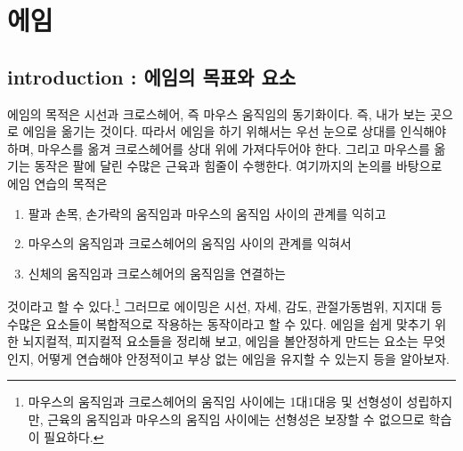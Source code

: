 \chapter{에임}{\label{chap:aim}}
\section{introduction : 에임의 목표와 요소}
에임의 목적은 시선과 크로스헤어, 즉 마우스 움직임의 동기화이다. 즉, 내가 보는 곳으로 에임을 옮기는 것이다. 따라서 에임을 하기 위해서는 우선 눈으로 상대를 인식해야 하며, 마우스를 옮겨 크로스헤어를 상대 위에 가져다두어야 한다. 그리고 마우스를 옮기는 동작은 팔에 달린 수많은 근육과 힘줄이 수행한다. 여기까지의 논의를 바탕으로 에임 연습의 목적은
\begin{enumerate}
    \item 팔과 손목, 손가락의 움직임과 마우스의 움직임 사이의 관계를 익히고
    \item 마우스의 움직임과 크로스헤어의 움직임 사이의 관계를 익혀서
    \item 신체의 움직임과 크로스헤어의 움직임을 연결하는
\end{enumerate}것이라고 할 수 있다.\footnote{마우스의 움직임과 크로스헤어의 움직임 사이에는 1대1대응 및 선형성이 성립하지만, 근육의 움직임과 마우스의 움직임 사이에는 선형성은 보장할 수 없으므로 학습이 필요하다.}
그러므로
에이밍은 시선, 자세, 감도, 관절가동범위, 지지대 등 수많은 요소들이 복합적으로 작용하는 동작이라고 할 수 있다. 에임을 쉽게 맞추기 위한 뇌지컬적, 피지컬적 요소들을 정리해 보고, 에임을 볼안정하게 만드는 요소는 무엇인지, 어떻게 연습해야 안정적이고 부상 없는 에임을 유지할 수 있는지 등을 알아보자.


